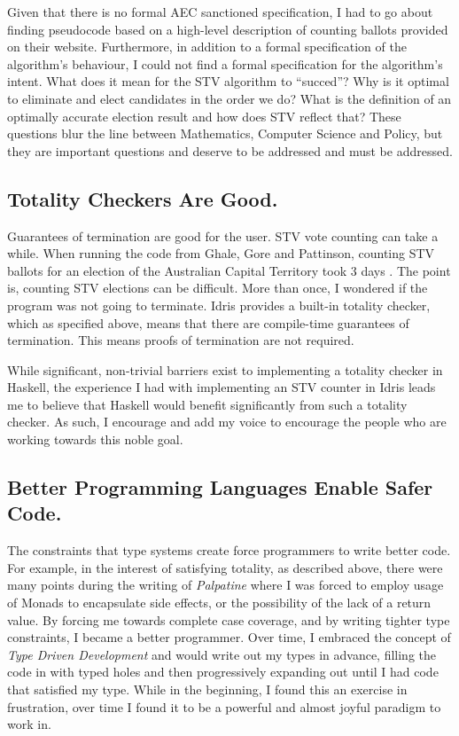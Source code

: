 Given that there is no formal AEC sanctioned specification, I had to go about
finding pseudocode based on a high-level description of counting ballots
provided on their website. Furthermore, in addition to a formal specification of
the algorithm's behaviour, I could not find a formal specification for the
algorithm's intent. What does it mean for the STV algorithm to ``succed''? Why
is it optimal to eliminate and elect candidates in the order we do? What is the
definition of an optimally accurate election result and how does STV reflect
that? These questions blur the line between Mathematics, Computer Science and
Policy, but they are important questions and deserve to be addressed and must be
addressed. 

\subsection{Totality Checkers Are Good.}

Guarantees of termination are good for the user. STV vote counting can take a
while. When running the code from Ghale, Gore and Pattinson, counting STV
ballots for an election of the Australian Capital Territory took 3 days
\cite{stv_haskell}. The point is, counting STV elections can be difficult. More
than once, I wondered if the program was not going to terminate. Idris provides
a built-in totality checker, which as specified above, means that there are
compile-time guarantees of termination. This means proofs of termination are not
required. 

While significant, non-trivial barriers exist to implementing a totality checker
in Haskell, the experience I had with implementing an STV counter in Idris leads
me to believe that Haskell would benefit significantly from such a totality
checker. As such, I encourage and add my voice to encourage the people who are
working towards this noble goal. 

\subsection{Better Programming Languages Enable Safer Code.}

The constraints that type systems create force programmers to write better code.
For example, in the interest of satisfying totality, as described above, there
were many points during the writing of \textit{Palpatine} where I was forced to
employ usage of Monads to encapsulate side effects, or the possibility of the
lack of a return value. By forcing me towards complete case coverage, and by
writing tighter type constraints, I became a better programmer. Over time, I
embraced the concept of \textit{Type Driven Development} and would write out my
types in advance, filling the code in with typed holes and then progressively
expanding out until I had code that satisfied my type. While in the beginning, I
found this an exercise in frustration, over time I found it to be a powerful and
almost joyful paradigm to work in. 

